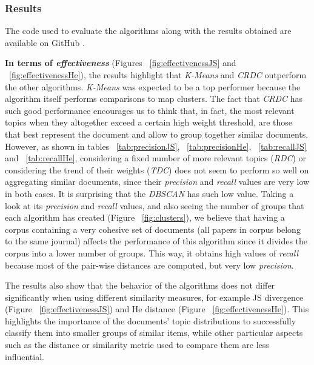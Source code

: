 \subsubsection{Results}

The code used to evaluate the algorithms along with the results obtained are available on GitHub \citep{Badenes-Olmedo2017a}.

\textbf{In terms of \textit{effectiveness}} (Figures ~\ref{fig:effectivenessJS} and ~\ref{fig:effectivenessHe}), the results highlight that \textit{K-Means} and \textit{CRDC} outperform the other algorithms. \textit{K-Means} was expected to be a top performer because the algorithm itself performs comparisons to map clusters. The fact that \textit{CRDC} has such good performance encourages us to think that, in fact, the most relevant topics when they altogether exceed a certain high weight threshold, are those that best represent the document and allow to group together similar documents. However, as shown in tables ~\ref{tab:precisionJS}, ~\ref{tab:precisionHe}, ~\ref{tab:recallJS} and ~\ref{tab:recallHe}, considering a fixed number of more relevant topics (\textit{RDC}) or considering the trend of their weights (\textit{TDC}) does not seem to perform so well on aggregating similar documents, since their \textit{precision} and \textit{recall} values are very low in both cases. It is surprising that the \textit{DBSCAN} has such low value. Taking a look at its \textit{precision} and \textit{recall} values, and also seeing the number of groups that each algorithm has created (Figure ~\ref{fig:clusters}), we believe that having a corpus containing a very cohesive set of documents (all papers in corpus belong to the same journal) affects the performance of this algorithm since it divides the corpus into a lower number of groups. This way, it obtains high values of \textit{recall} because most of the pair-wise distances are computed, but very low \textit{precision}.

The results also show that the behavior of the algorithms does not differ significantly when using different similarity measures, for example JS divergence (Figure ~\ref{fig:effectivenessJS}) and He distance (Figure ~\ref{fig:effectivenessHe}). This highlights the importance of the documents' topic distributions to successfully classify them into smaller groups of similar items, while other particular aspects such as the distance or similarity metric used to compare them are less influential.

